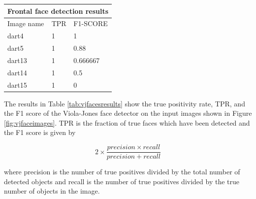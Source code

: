 \documentclass{article}
\begin{document}
\begin{multicols}{2}
\label{fig:vjfaceimages}

\begin{center}
\begin{tabular}{ |p{2cm}||p{2cm}|p{2cm}| }
 \hline
 \multicolumn{3}{|c|}{Frontal face detection results} \\
 \hline
 Image name & TPR & F1-SCORE \\
 \hline
 dart4  & 1   & 1         \\
 dart5  & 1   & 0.88      \\
 dart13 & 1   & 0.666667  \\ 
 dart14 & 1   & 0.5       \\ 
 dart15 & 1   & 0         \\ 
 \hline
\end{tabular}
\label{tab:vjfacesresults}
\end{center}

\bigskip

The results in Table \ref{tab:vjfacesresults} show the true positivity rate, TPR, and the F1 score of the Viola-Jones face detector on the input images shown in Figure \ref{fig:vjfaceimages}. TPR is the fraction of true faces which have been detected and the F1 score is given by

\[ 2 \times \frac{precision \times recall}{precision + recall} \]

where precision is the number of true positives divided by the total number of detected objects and recall is the number of true positives divided by the true number of objects in the image.


\end{multicols}
\end{document}
